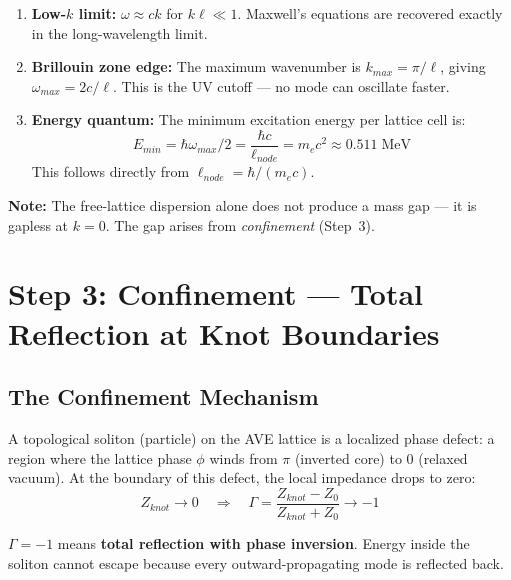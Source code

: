 \begin{enumerate}
    \item \textbf{Low-$k$ limit:}  $\omega \approx ck$ for
    $k\ell \ll 1$.  Maxwell's equations are recovered exactly
    in the long-wavelength limit.
    \item \textbf{Brillouin zone edge:}  The maximum wavenumber is
    $k_{max} = \pi/\ell$, giving $\omega_{max} = 2c/\ell$.  This is
    the UV cutoff --- no mode can oscillate faster.
    \item \textbf{Energy quantum:}  The minimum excitation energy per
    lattice cell is:
    \begin{equation}
        E_{min} = \hbar\omega_{max}/2 = \frac{\hbar c}{\ell_{node}}
        = m_e c^2 \approx 0.511\;\text{MeV}
        \label{eq:e_min}
    \end{equation}
    This follows directly from $\ell_{node} = \hbar/(m_e c)$.
\end{enumerate}

\noindent
\textbf{Note:}  The free-lattice dispersion alone does not produce a mass
gap --- it is gapless at $k = 0$.  The gap arises from
\textit{confinement} (Step~3).

\section{Step 3: Confinement --- Total Reflection at Knot Boundaries}
\label{sec:mass_gap_confinement}

\subsection{The Confinement Mechanism}

A topological soliton (particle) on the AVE lattice is a localized
phase defect: a region where the lattice phase $\phi$ winds from $\pi$
(inverted core) to $0$ (relaxed vacuum).  At the boundary of this
defect, the local impedance drops to zero:
\begin{equation}
    Z_{knot} \to 0
    \quad\Longrightarrow\quad
    \Gamma = \frac{Z_{knot} - Z_0}{Z_{knot} + Z_0} \to -1
    \label{eq:confinement_gamma}
\end{equation}

$\Gamma = -1$ means \textbf{total reflection with phase inversion}.
Energy inside the soliton cannot escape because every outward-propagating
mode is reflected back.

